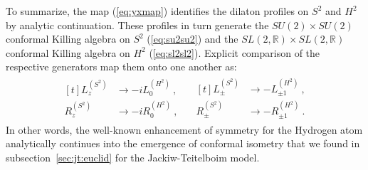 \documentclass[12pt]{article}
\begin{document}
To summarize, the map (\ref{eq:yxmap}) identifies the dilaton profiles on $S^2$ and $H^2$ by analytic continuation.  These profiles in turn generate the $SU(2) \times SU(2)$ conformal Killing algebra on $S^2$ (\ref{eq:su2su2}) and the $SL(2,\mathbb{R}) \times SL(2,\mathbb{R})$ conformal Killing algebra on $H^2$ (\ref{eq:sl2sl2}). Explicit comparison of the respective generators map them onto one another as:
\begin{equation}
	\begin{split}\begin{aligned}[t]
		L_z^{(S^2)} &\to -i L_0^{(H^2)}~, \quad \\
		R_z^{(S^2)} &\to -i R_0^{(H^2)}~, \quad
	\end{aligned}
	\begin{aligned}[t]
		L_\pm^{(S^2)} &\to - L_{\pm 1}^{(H^2)}~, \\
		R_\pm^{(S^2)} &\to - R_{\pm 1}^{(H^2)}~.
	\end{aligned}\end{split}
\end{equation}
In other words, the well-known enhancement of symmetry for the Hydrogen atom analytically continues into the emergence of conformal isometry that we found in subsection~\ref{sec:jt:euclid} for the Jackiw-Teitelboim model.  
\end{document}
